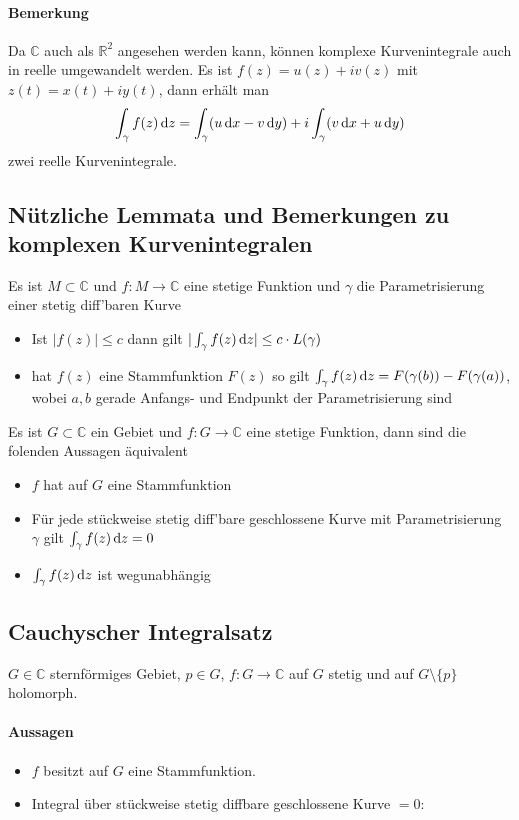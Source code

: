 \paragraph{Bemerkung}
Da $\mathbb{C}$ auch als $\mathbb{R}^2$ angesehen werden kann, können komplexe Kurvenintegrale auch in reelle umgewandelt werden. Es ist $f(z)=u(z)+iv(z)$ mit $z(t)=x(t)+iy(t)$, dann erhält man
\begin{equation*}
    \int_{\gamma} f(z)\mathop{}\!\mathrm{d} z = \int_{\gamma}(u \mathop{}\!\mathrm{d} x - v\mathop{}\!\mathrm{d} y) + i \int_{\gamma}(v\mathop{}\!\mathrm{d} x + u\mathop{}\!\mathrm{d} y)
\end{equation*}
zwei reelle Kurvenintegrale.

\subsection{Nützliche Lemmata und Bemerkungen zu komplexen Kurvenintegralen}
Es ist $M\subset\mathbb{C}$ und $f:M\to\mathbb{C}$ eine stetige Funktion und $\gamma$ die Parametrisierung einer stetig diff'baren Kurve
\begin{itemize}
    \item Ist $|f(z)|\leq c$ dann gilt $|\int_{\gamma}f(z)\mathop{}\!\mathrm{d} z|\leq c\cdot L(\gamma)$
    \item hat $f(z)$ eine Stammfunktion $F(z)$ so gilt $\int_\gamma f(z)\mathop{}\!\mathrm{d} z = F(\gamma(b)) - F(\gamma(a))$, wobei $a,b$ gerade Anfangs- und Endpunkt der Parametrisierung sind
\end{itemize}

Es ist $G\subset\mathbb{C}$ ein Gebiet und $f:G\to\mathbb{C}$ eine stetige Funktion, dann sind die folenden Aussagen äquivalent
\begin{itemize}
    \item $f$ hat auf $G$ eine Stammfunktion
    \item Für jede stückweise stetig diff'bare geschlossene Kurve mit Parametrisierung $\gamma$ gilt $\int_\gamma f(z)\mathop{}\!\mathrm{d} z = 0$
    \item $\int_\gamma f(z)\mathop{}\!\mathrm{d} z$ ist wegunabhängig
\end{itemize}


\subsection{Cauchyscher Integralsatz}
$G \in \mathbb{C}$ sternförmiges Gebiet, $p \in G$, $f: G \rightarrow \mathbb{C}$ auf $G$ stetig und auf $G \setminus \{p\}$ holomorph.

\paragraph{Aussagen}
\begin{itemize}
    \item $f$ besitzt auf $G$ eine Stammfunktion.
    \item Integral über stückweise stetig diffbare geschlossene Kurve $=0$:
\end{itemize}


